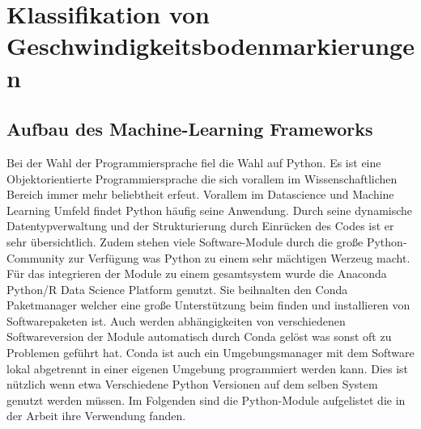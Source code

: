 %

\chapter{Klassifikation von Geschwindigkeitsbodenmarkierungen}
\label{cha:Klassifikation von Geschwindigkeitsbodenmarkierungen} 
%
%


\section{Aufbau des Machine-Learning Frameworks}
\label{sec:Aufbau des Machine-Learning Frameworks}

Bei der Wahl der Programmiersprache fiel die Wahl auf Python. Es ist eine Objektorientierte Programmiersprache die sich vorallem im Wissenschaftlichen Bereich immer mehr beliebtheit erfeut. Vorallem im Datascience und Machine Learning Umfeld findet Python h{\"a}ufig seine Anwendung. Durch seine dynamische Datentypverwaltung und der Strukturierung durch Einr{\"u}cken des Codes ist er sehr {\"u}bersichtlich. Zudem stehen viele Software-Module durch die gro{\ss}e Python-Community zur Verf{\"u}gung was Python zu einem sehr m{\"a}chtigen Werzeug macht.
F{\"u}r das integrieren der Module zu einem gesamtsystem wurde die Anaconda Python/R Data Science Platform genutzt. Sie beihnalten den Conda Paketmanager welcher eine gro{\ss}e Unterst{\"u}tzung beim finden und installieren von Softwarepaketen ist. Auch werden abh{\"a}ngigkeiten von verschiedenen Softwareversion der Module automatisch durch Conda gel{\"o}st was sonst oft zu Problemen gef{\"u}hrt hat. Conda ist auch ein Umgebungsmanager mit dem Software lokal abgetrennt in einer eigenen Umgebung programmiert werden kann. Dies ist n{\"u}tzlich wenn etwa Verschiedene Python Versionen auf dem selben System genutzt werden m{\"u}ssen.
Im Folgenden sind die Python-Module aufgelistet die in der Arbeit ihre Verwendung fanden.

